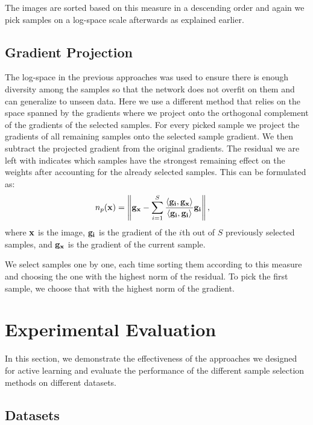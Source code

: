 \documentclass[letterpaper, 10 pt, conference]{ieeeconf}  %
\begin{document}
The images are sorted based on this measure in a descending order and again we pick samples on a log-space scale afterwards as explained earlier.

\subsection{Gradient Projection} \label{sec:grad_proj}

The log-space in the previous approaches was used to ensure there is enough diversity among the samples so that the network does not overfit on them and can generalize to unseen data. Here we use a different method that relies on the space spanned by the gradients where we project onto the orthogonal complement of the gradients of the selected samples. For every picked sample we project the gradients of all remaining samples onto the selected sample gradient. We then subtract the projected gradient from the original gradients. The residual we are left with indicates which samples have the strongest remaining effect on the weights after accounting for the already selected samples. This can be formulated as:
\begin{align}
n_p(\bold{x}) &=  \left\lVert \bold{g_x} - \sum_{i=1}^S \frac{\left\langle \bold{g_i}, \bold{g_x} \right\rangle}{\left\langle \bold{g_i}, \bold{g_i} \right\rangle} \bold{g_i} \right\rVert,
\end{align}
where $\bold{x}$ is the image, $\bold{g_i}$ is the gradient of the $i$th out of $S$ previously selected samples, and $\bold{g_x}$ is the gradient of the current sample.

We select samples one by one, each time sorting them according to this measure and choosing the one with the highest norm of the residual. To pick the first sample, we choose that with the highest norm of the gradient.



\section{Experimental Evaluation}
\label{sec:exp}

In this section, we demonstrate the effectiveness of the approaches we designed for active learning and evaluate the performance of the different sample selection methods on different datasets.


\subsection{Datasets}
\end{document}

